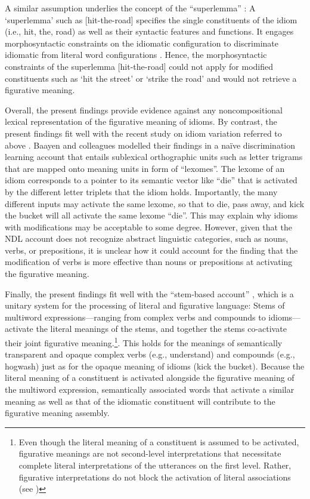 \documentclass[output=paper]{langsci/langscibook}
\begin{document}
A similar assumption underlies the concept of the “superlemma” \citep{sprenger:2006}: A ‘superlemma’ such as [hit-the-road] specifies the single constituents of the idiom (i.e., hit, the, road) as well as their syntactic features and functions. It engages morphosyntactic constraints on the idiomatic configuration to discriminate idiomatic from literal word configurations \citep{sprenger:2006}. Hence, the morphosyntactic constraints of the superlemma [hit-the-road] could not apply for modified constituents such as ‘hit the street’ or ‘strike the road’ and would not retrieve a figurative meaning. 


Overall, the present findings provide evidence against any noncompositional lexical representation of the figurative meaning of idioms. By contrast, the present findings fit well with the recent study on idiom variation referred to above \citep{geeraert:2017}. Baayen and colleagues modelled their findings in a naïve discrimination learning account \citep{baayen:2013,baayen:2011,baayen:2016} that entails sublexical orthographic units such as letter trigrams that are mapped onto meaning units in form of “lexomes”. The lexome of an idiom corresponds to a pointer to its semantic vector like “die” that is activated by the different letter triplets that the idiom holds. Importantly, the many different inputs may activate the same lexome, so that to die, pass away, and kick the bucket will all activate the same lexome “die”. This may explain why idioms with modifications may be acceptable to some degree. However, given that the NDL account does not recognize abstract linguistic categories, such as nouns, verbs, or prepositions, it is unclear how it could account for the finding that the modification of verbs is more effective than nouns or prepositions at activating the figurative meaning. 

Finally, the present findings fit well with the “stem-based account” \citep{gunther:2018,rabanus:2008,smolka:2015,smolka:2017,smolka:2018,smolka:2014,smolka:2007}, which is a unitary system for the processing of literal and figurative language: Stems of multiword expressions—ranging from complex verbs and compounds to idioms—activate the literal meanings of the stems, and together the stems co-activate their joint figurative meaning.\footnote{Even though the literal meaning of a constituent is assumed to be activated, figurative meanings are not second-level interpretations that necessitate complete literal interpretations of the utterances on the first level. Rather, figurative interpretations do not block the activation of literal associations (see \citet{gibbs:2002})}. This holds for the meanings of semantically transparent and opaque complex verbs (e.g., understand) and compounds (e.g., hogwash) just as for the opaque meaning of idioms (kick the bucket). Because the literal meaning of a constituent is activated alongside the figurative meaning of the multiword expression, semantically associated words that activate a similar meaning as well as that of the idiomatic constituent will contribute to the figurative meaning assembly. 
\end{document}

